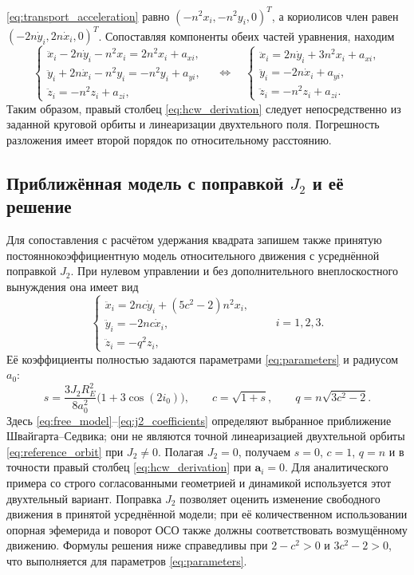 \documentclass[a4paper,12pt]{article}
\begin{document}
\eqref{eq:transport_acceleration} равно
$(-n^2x_i,-n^2y_i,0)^T$, а кориолисов член равен
$(-2n\dot y_i,2n\dot x_i,0)^T$. Сопоставляя компоненты обеих
частей уравнения, находим
\begin{equation}
 \begin{cases}
  \ddot x_i-2n\dot y_i-n^2x_i=2n^2x_i+a_{xi},\\
  \ddot y_i+2n\dot x_i-n^2y_i=-n^2y_i+a_{yi},\\
  \ddot z_i=-n^2z_i+a_{zi},
 \end{cases}
 \quad\Longleftrightarrow\quad
 \begin{cases}
  \ddot x_i=2n\dot y_i+3n^2x_i+a_{xi},\\
  \ddot y_i=-2n\dot x_i+a_{yi},\\
  \ddot z_i=-n^2z_i+a_{zi}.
 \end{cases}
 \label{eq:hcw_derivation}
\end{equation}
Таким образом, правый столбец \eqref{eq:hcw_derivation} следует
непосредственно из заданной круговой орбиты и линеаризации
двухтельного поля. Погрешность разложения имеет второй порядок по
относительному расстоянию.

\subsection{Приближённая модель с поправкой $J_2$ и её решение}

Для сопоставления с расчётом удержания квадрата запишем также
принятую постояннокоэффициентную модель относительного движения
с усреднённой поправкой $J_2$. При нулевом управлении и без
дополнительного внеплоскостного вынуждения она имеет вид
\begin{equation}
    \begin{cases}
        \ddot x_i=2nc\dot y_i+(5c^2-2)n^2x_i,\\
        \ddot y_i=-2nc\dot x_i,\\
        \ddot z_i=-q^2z_i,
    \end{cases}
    \qquad i=1,2,3.
    \label{eq:free_model}
\end{equation}
Её коэффициенты полностью задаются параметрами
\eqref{eq:parameters} и радиусом $a_0$:
\begin{equation}
    s=\frac{3J_2R_E^2}{8a_0^2}
       \bigl(1+3\cos(2i_0)\bigr),\qquad
    c=\sqrt{1+s},\qquad q=n\sqrt{3c^2-2}.
    \label{eq:j2_coefficients}
\end{equation}
Здесь \eqref{eq:free_model}--\eqref{eq:j2_coefficients} определяют
выбранное приближение Швайгарта--Седвика; они не являются точной
линеаризацией двухтельной орбиты \eqref{eq:reference_orbit}
при $J_2\ne0$. Полагая $J_2=0$, получаем $s=0$, $c=1$,
$q=n$ и в точности правый столбец \eqref{eq:hcw_derivation}
при $\mathbf a_i=0$. Для аналитического примера со строго согласованными
геометрией и динамикой используется этот двухтельный вариант.
Поправка $J_2$ позволяет оценить изменение свободного движения в
принятой усреднённой модели; при её количественном использовании
опорная эфемерида и поворот ОСО также должны соответствовать
возмущённому движению. Формулы решения ниже справедливы при
$2-c^2>0$ и $3c^2-2>0$, что выполняется для
параметров \eqref{eq:parameters}.
\end{document}
